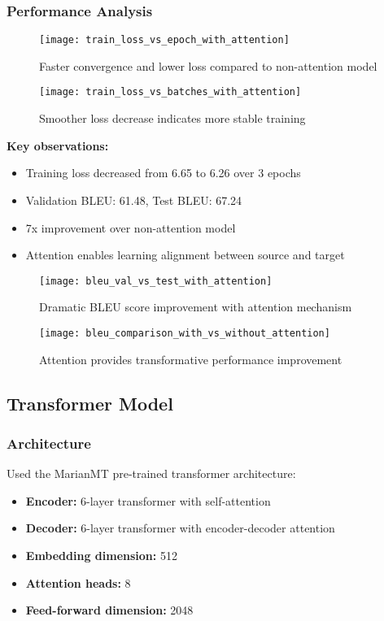 \documentclass[12pt]{article}
\begin{document}
\subsubsection*{Performance Analysis}

\begin{figure}[H]
    \centering
    \texttt{[image: train\_loss\_vs\_epoch\_with\_attention]}
    \caption{Faster convergence and lower loss compared to non-attention model}
\end{figure}

\begin{figure}[H]
    \centering
    \texttt{[image: train\_loss\_vs\_batches\_with\_attention]}
    \caption{Smoother loss decrease indicates more stable training}
\end{figure}

\textbf{Key observations:}
\begin{itemize}
    \item Training loss decreased from 6.65 to 6.26 over 3 epochs
    \item Validation BLEU: 61.48, Test BLEU: 67.24
    \item 7x improvement over non-attention model
    \item Attention enables learning alignment between source and target
\end{itemize}

\begin{figure}[H]
    \centering
    \texttt{[image: bleu\_val\_vs\_test\_with\_attention]}
    \caption{Dramatic BLEU score improvement with attention mechanism}
\end{figure}

\begin{figure}[H]
    \centering
    \texttt{[image: bleu\_comparison\_with\_vs\_without\_attention]}
    \caption{Attention provides transformative performance improvement}
\end{figure}

\subsection{Transformer Model}

\subsubsection*{Architecture}
Used the MarianMT pre-trained transformer architecture:
\begin{itemize}
    \item \textbf{Encoder:} 6-layer transformer with self-attention
    \item \textbf{Decoder:} 6-layer transformer with encoder-decoder attention
    \item \textbf{Embedding dimension:} 512
    \item \textbf{Attention heads:} 8
    \item \textbf{Feed-forward dimension:} 2048
\end{itemize}
\end{document}
